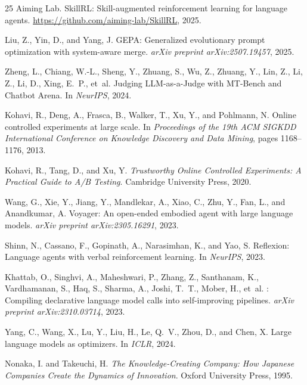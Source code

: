 \documentclass[11pt]{article}
\begin{document}
\begin{thebibliography}{25}
Aiming Lab.
\newblock SkillRL: Skill-augmented reinforcement learning for language agents.
\newblock \url{https://github.com/aiming-lab/SkillRL}, 2025.

Liu, Z., Yin, D., and Yang, J.
\newblock GEPA: Generalized evolutionary prompt optimization with system-aware merge.
\newblock \emph{arXiv preprint arXiv:2507.19457}, 2025.

Zheng, L., Chiang, W.-L., Sheng, Y., Zhuang, S., Wu, Z., Zhuang, Y., Lin, Z., Li, Z., Li, D., Xing, E.~P., et~al.
\newblock Judging {LLM}-as-a-Judge with {MT}-Bench and Chatbot Arena.
\newblock In \emph{NeurIPS}, 2024.

Kohavi, R., Deng, A., Frasca, B., Walker, T., Xu, Y., and Pohlmann, N.
\newblock Online controlled experiments at large scale.
\newblock In \emph{Proceedings of the 19th ACM SIGKDD International Conference on Knowledge Discovery and Data Mining}, pages 1168--1176, 2013.

Kohavi, R., Tang, D., and Xu, Y.
\newblock \emph{Trustworthy Online Controlled Experiments: A Practical Guide to A/B Testing}.
\newblock Cambridge University Press, 2020.

Wang, G., Xie, Y., Jiang, Y., Mandlekar, A., Xiao, C., Zhu, Y., Fan, L., and Anandkumar, A.
\newblock Voyager: An open-ended embodied agent with large language models.
\newblock \emph{arXiv preprint arXiv:2305.16291}, 2023.

Shinn, N., Cassano, F., Gopinath, A., Narasimhan, K., and Yao, S.
\newblock Reflexion: Language agents with verbal reinforcement learning.
\newblock In \emph{NeurIPS}, 2023.

Khattab, O., Singhvi, A., Maheshwari, P., Zhang, Z., Santhanam, K., Vardhamanan, S., Haq, S., Sharma, A., Joshi, T.~T., Mober, H., et~al.
: Compiling declarative language model calls into self-improving pipelines.
\newblock \emph{arXiv preprint arXiv:2310.03714}, 2023.

Yang, C., Wang, X., Lu, Y., Liu, H., Le, Q.~V., Zhou, D., and Chen, X.
\newblock Large language models as optimizers.
\newblock In \emph{ICLR}, 2024.

Nonaka, I. and Takeuchi, H.
\newblock \emph{The Knowledge-Creating Company: How Japanese Companies Create the Dynamics of Innovation}.
\newblock Oxford University Press, 1995.


\end{thebibliography}
\end{document}
